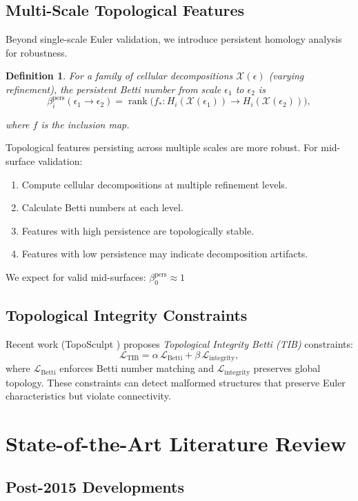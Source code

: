 \documentclass[conference]{IEEEtran}
\newtheorem{definition}{Definition}
\begin{document}
\subsection{Multi-Scale Topological Features}
Beyond single-scale Euler validation, we introduce persistent homology analysis for robustness.
\begin{definition}
For a family of cellular decompositions $\mathcal{X}(\epsilon)$ (varying refinement), the \emph{persistent Betti number} from scale $\epsilon_1$ to $\epsilon_2$ is
\[
\beta_i^{\text{pers}}(\epsilon_1 \rightarrow \epsilon_2)
  = \operatorname{rank}\bigl(f_* : H_i(\mathcal{X}(\epsilon_1))
  \to H_i(\mathcal{X}(\epsilon_2)) \bigr),
\]

where $f$ is the inclusion map.
\end{definition}
Topological features persisting across multiple scales are more robust. For mid-surface validation:
\begin{enumerate}
\item Compute cellular decompositions at multiple refinement levels.
\item Calculate Betti numbers at each level.
\item Features with high persistence are topologically stable.
\item Features with low persistence may indicate decomposition artifacts.
\end{enumerate}
We expect for valid mid-surfaces:
$\beta_0^{\text{pers}} \approx 1$
\subsection{Topological Integrity Constraints}
Recent work (TopoSculpt \cite{Hu2024}) proposes \emph{Topological Integrity Betti (TIB)} constraints:
\[
\mathcal{L}_{\text{TIB}} = \alpha\,\mathcal{L}_{\text{Betti}} + \beta\,\mathcal{L}_{\text{integrity}},
\]
where $\mathcal{L}_{\text{Betti}}$ enforces Betti number matching and $\mathcal{L}_{\text{integrity}}$ preserves global topology. These constraints can detect malformed structures that preserve Euler characteristics but violate connectivity. \section{State-of-the-Art Literature Review}
\subsection{Post-2015 Developments}
\end{document}
